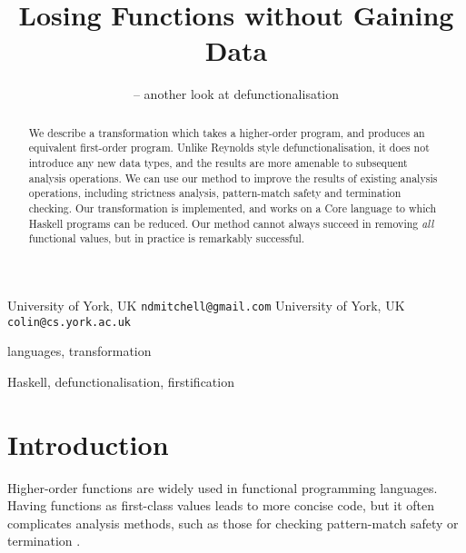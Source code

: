 \documentclass[preprint]{sigplanconf}
\begin{document}
\copyrightdata{[to be supplied]}

\titlebanner{} %
\preprintfooter{}   %

\title{Losing Functions without Gaining Data}
\subtitle{ -- another look at defunctionalisation}

           {University of York, UK}
           {\verb"ndmitchell@gmail.com"}
           {University of York, UK}
           {\verb"colin@cs.york.ac.uk"}

\maketitle

\begin{abstract}
We describe a transformation which takes a higher-order program, and produces an equivalent first-order program. Unlike Reynolds style defunctionalisation, it does not introduce any new data types, and the results are more amenable to subsequent analysis operations. We can use our method to improve the results of existing analysis operations, including strictness analysis, pattern-match safety and termination checking. Our transformation is implemented, and works on a Core language to which Haskell programs can be reduced. Our method cannot always succeed in removing \textit{all} functional values, but in practice is remarkably successful.
\end{abstract}


\terms
languages, transformation

\keywords
Haskell, defunctionalisation, firstification

\section{Introduction}

Higher-order functions are widely used in functional programming languages.  Having functions as first-class values leads to more concise code, but it often complicates analysis methods, such as those for checking pattern-match safety \cite{me:catch} or termination \cite{sereni:higher_order_termination}.
\end{document}
